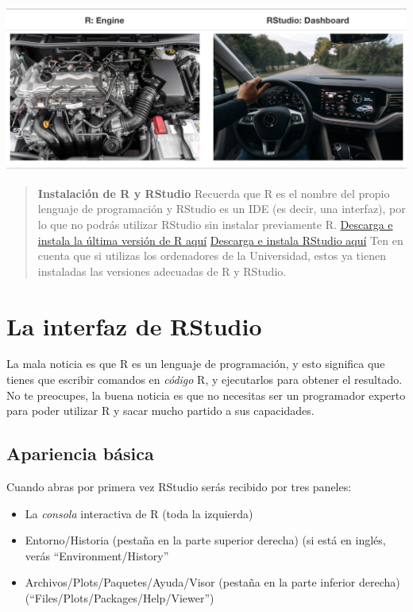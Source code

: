 \documentclass[
  letterpaper,
  DIV=11,
  numbers=noendperiod]{scrreprt}
\providecommand{\tightlist}{%
  \setlength{\itemsep}{0pt}\setlength{\parskip}{0pt}}\usepackage{longtable,booktabs,array}
\begin{document}
\includegraphics{images/01-intro-r/r_vs_rstudio_1.png}

\begin{quote}
\textbf{Instalación de R y RStudio} Recuerda que R es el nombre del
propio lenguaje de programación y RStudio es un IDE (es decir, una
interfaz), por lo que no podrás utilizar RStudio sin instalar
previamente R. \href{https://www.r-project.org/}{Descarga e instala la
última versión de R aquí}
\href{https://posit.co/download/rstudio-desktop/\#download}{Descarga e
instala RStudio aquí} Ten en cuenta que si utilizas los ordenadores de
la Universidad, estos ya tienen instaladas las versiones adecuadas de R
y RStudio.
\end{quote}

\hypertarget{la-interfaz-de-rstudio}{%
\section{La interfaz de RStudio}\label{la-interfaz-de-rstudio}}

La mala noticia es que R es un lenguaje de programación, y esto
significa que tienes que escribir comandos en \emph{código} R, y
ejecutarlos para obtener el resultado. No te preocupes, la buena noticia
es que no necesitas ser un programador experto para poder utilizar R y
sacar mucho partido a sus capacidades.

\hypertarget{apariencia-buxe1sica}{%
\subsection{Apariencia básica}\label{apariencia-buxe1sica}}

Cuando abras por primera vez RStudio serás recibido por tres paneles:

\begin{itemize}
\tightlist
\item
  La \emph{consola} interactiva de R (toda la izquierda)
\item
  Entorno/Historia (pestaña en la parte superior derecha) (si está en
  inglés, verás ``Environment/History''
\item
  Archivos/Plots/Paquetes/Ayuda/Visor (pestaña en la parte inferior
  derecha) (``Files/Plots/Packages/Help/Viewer'')
\end{itemize}
\end{document}
